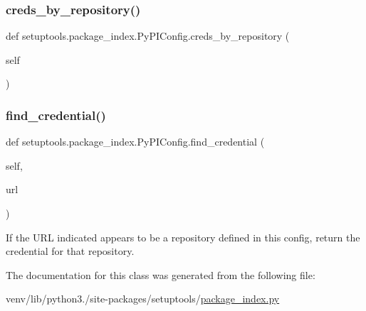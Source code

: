 \subsubsection{\texorpdfstring{creds\+\_\+by\+\_\+repository()}{creds\_by\_repository()}}
{\footnotesize\ttfamily def setuptools.\+package\+\_\+index.\+Py\+P\+I\+Config.\+creds\+\_\+by\+\_\+repository (\begin{DoxyParamCaption}\item[{}]{self }\end{DoxyParamCaption})}

\mbox{\label{classsetuptools_1_1package__index_1_1PyPIConfig_a591eed255577ae924d683a1cdfc6cbbd}} 
\subsubsection{\texorpdfstring{find\+\_\+credential()}{find\_credential()}}
{\footnotesize\ttfamily def setuptools.\+package\+\_\+index.\+Py\+P\+I\+Config.\+find\+\_\+credential (\begin{DoxyParamCaption}\item[{}]{self,  }\item[{}]{url }\end{DoxyParamCaption})}

\begin{DoxyVerb}If the URL indicated appears to be a repository defined in this
config, return the credential for that repository.
\end{DoxyVerb}
 

The documentation for this class was generated from the following file\+:\begin{DoxyCompactItemize}
\item 
venv/lib/python3./site-\/packages/setuptools/\hyperlink{package__index_8py}{package\+\_\+index.\+py}\end{DoxyCompactItemize}
